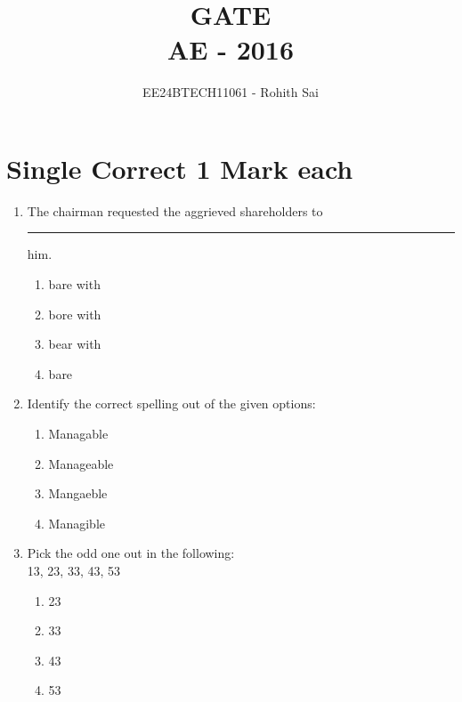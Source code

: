\documentclass[journal]{IEEEtran}
\begin{document}

\vspace{3cm}

\title{GATE\\AE - 2016}
\author{EE24BTECH11061 - Rohith Sai}
\maketitle

\renewcommand{\thefigure}{\theenumi}
\renewcommand{\thetable}{\theenumi}

\section*{Single Correct 1 Mark each}
\begin{enumerate}
\item The chairman requested the aggrieved shareholders to \rule{1cm}{0.15mm} him.
\begin{multicols}{2}
    \begin{enumerate}
        \item bare with
        \item bore with
        \item bear with
        \item bare
    \end{enumerate}
\end{multicols}

\item Identify the correct spelling out of the given options:
\begin{multicols}{1}
    \begin{enumerate}
        \item Managable
        \item Manageable
        \item Mangaeble
        \item Managible
    \end{enumerate}
\end{multicols}

\item Pick the odd one out in the following:\\
13, 23, 33, 43, 53
\begin{multicols}{1}
    \begin{enumerate}
        \item 23
        \item 33
        \item 43
        \item 53
    \end{enumerate}
\end{multicols}


\end{enumerate}
\end{document}
